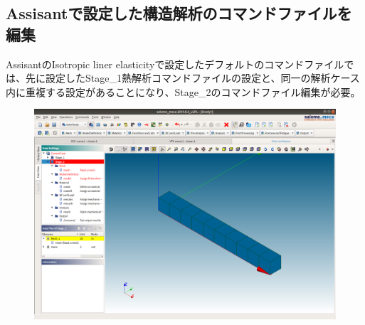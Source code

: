 \subsection{Assisantで設定した構造解析のコマンドファイルを編集}
AssisantのIsotropic liner elasticityで設定したデフォルトのコマンドファイルでは、先に設定したStage\_1熱解析コマンドファイルの設定と、同一の解析ケース内に重複する設定があることになり、Stage\_2のコマンドファイル編集が必要。
\begin{figure}[H]
	\centering
	\includegraphics[width=0.7\columnwidth]{fig/conflict.png}
\end{figure}
\clearpage
